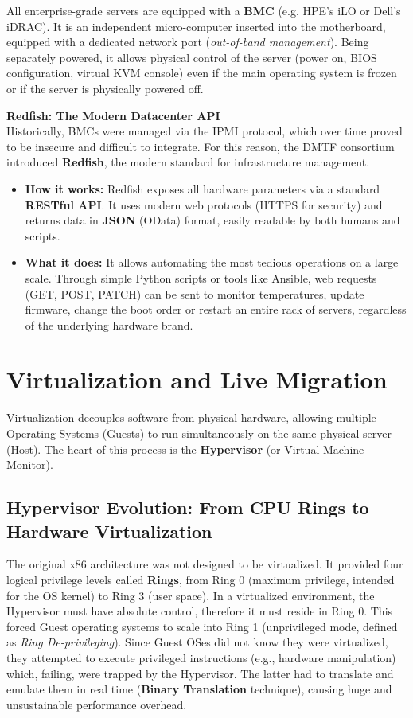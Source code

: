 \begin{tipbox}
All enterprise-grade servers are equipped with a \textbf{BMC} (e.g. HPE's iLO or Dell's iDRAC). It is an independent micro-computer inserted into the motherboard, equipped with a dedicated network port (\textit{out-of-band management}). Being separately powered, it allows physical control of the server (power on, BIOS configuration, virtual KVM console) even if the main operating system is frozen or if the server is physically powered off.

\textbf{Redfish: The Modern Datacenter API}\\
Historically, BMCs were managed via the IPMI protocol, which over time proved to be insecure and difficult to integrate. For this reason, the DMTF consortium introduced \textbf{Redfish}, the modern standard for infrastructure management.
\begin{itemize}
    \item \textbf{How it works:} Redfish exposes all hardware parameters via a standard \textbf{RESTful API}. It uses modern web protocols (HTTPS for security) and returns data in \textbf{JSON} (OData) format, easily readable by both humans and scripts.
    \item \textbf{What it does:} It allows automating the most tedious operations on a large scale. Through simple Python scripts or tools like Ansible, web requests (GET, POST, PATCH) can be sent to monitor temperatures, update firmware, change the boot order or restart an entire rack of servers, regardless of the underlying hardware brand.
\end{itemize}
\end{tipbox}

\section{Virtualization and Live Migration}
Virtualization decouples software from physical hardware, allowing multiple Operating Systems (Guests) to run simultaneously on the same physical server (Host). The heart of this process is the \textbf{Hypervisor} (or Virtual Machine Monitor).

\subsection{Hypervisor Evolution: From CPU Rings to Hardware Virtualization}
The original x86 architecture was not designed to be virtualized. It provided four logical privilege levels called \textbf{Rings}, from Ring 0 (maximum privilege, intended for the OS kernel) to Ring 3 (user space). 
In a virtualized environment, the Hypervisor must have absolute control, therefore it must reside in Ring 0. This forced Guest operating systems to scale into Ring 1 (unprivileged mode, defined as \textit{Ring De-privileging}). Since Guest OSes did not know they were virtualized, they attempted to execute privileged instructions (e.g., hardware manipulation) which, failing, were trapped by the Hypervisor. The latter had to translate and emulate them in real time (\textbf{Binary Translation} technique), causing huge and unsustainable performance overhead.

